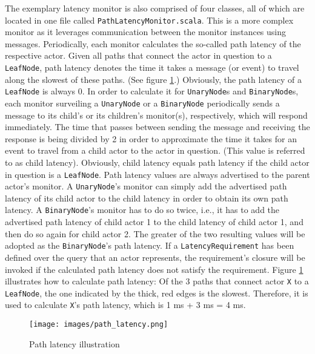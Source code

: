 \documentclass[article, type=bsc, colorback, accentcolor=tud8b, parskip=half, bibliography=totocnumbered]{tudthesis}
\begin{document}
The exemplary latency monitor is also comprised of four classes, all of which are located in one file called \lstinline{PathLatencyMonitor.scala}.
This is a more complex monitor as it leverages communication between the monitor instances using messages.
Periodically, each monitor calculates the so-called path latency of the respective actor.
Given all paths that connect the actor in question to a \lstinline{LeafNode}, path latency denotes the time it takes a message (or event) to travel along the slowest of these paths.
(See figure \ref{fig:path_latency}.)
Obviously, the path latency of a \lstinline{LeafNode} is always 0.
In order to calculate it for \lstinline{UnaryNode}s and \lstinline{BinaryNode}s, each monitor surveiling a \lstinline{UnaryNode} or a \lstinline{BinaryNode} periodically sends a message to its child's or its children's monitor(s), respectively, which will respond immediately.
The time that passes between sending the message and receiving the response is being divided by 2 in order to approximate the time it takes for an event to travel from a child actor to the actor in question.
(This value is referred to as child latency).
Obviously, child latency equals path latency if the child actor in question is a \lstinline{LeafNode}.
Path latency values are always advertised to the parent actor's monitor.
A \lstinline{UnaryNode}'s monitor can simply add the advertised path latency of its child actor to the child latency in order to obtain its own path latency.
A \lstinline{BinaryNode}'s monitor has to do so twice, i.e., it has to add the advertised path latency of child actor 1 to the child latency of child actor 1, and then do so again for child actor 2.
The greater of the two resulting values will be adopted as the \lstinline{BinaryNode}'s path latency.
If a \lstinline{LatencyRequirement} has been defined over the query that an actor represents, the requirement's closure will be invoked if the calculated path latency does not satisfy the requirement.
Figure \ref{fig:path_latency} illustrates how to calculate path latency:
Of the 3 paths that connect actor \lstinline{X} to a \lstinline{LeafNode}, the one indicated by the thick, red edges is the slowest.
Therefore, it is used to calculate \lstinline{X}'s path latency, which is 1 ms + 3 ms = 4 ms.

\begin{figure}
\caption{Path latency illustration}
\label{fig:path_latency}
\texttt{[image: images/path\_latency.png]}
\centering
\end{figure}
\end{document}
